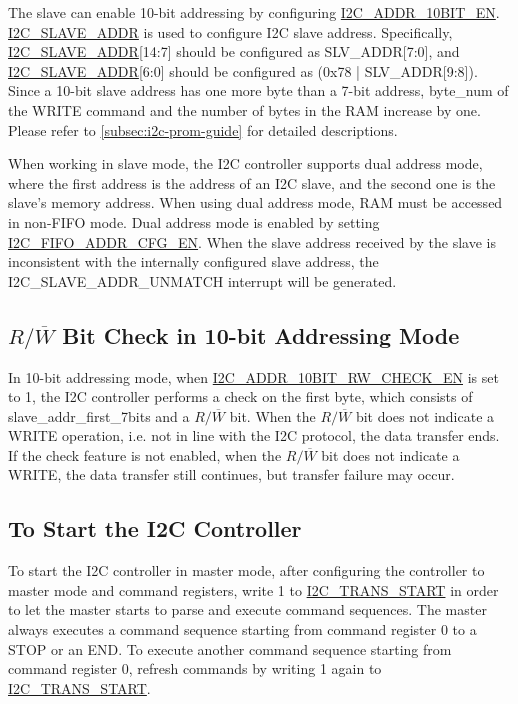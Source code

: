 \documentclass[main\_\_EN.tex]{subfiles}
\begin{document}
The slave can enable 10-bit addressing by configuring \hyperref[fielddesc:I2CADDR10BITEN]{I2C\_ADDR\_10BIT\_EN}. \hyperref[fielddesc:I2CSLAVEADDR]{I2C\_SLAVE\_ADDR} is used to configure I2C slave address. Specifically, \hyperref[fielddesc:I2CSLAVEADDR]{I2C\_SLAVE\_ADDR}[14:7] should be configured as SLV\_ADDR[7:0], and  \hyperref[fielddesc:I2CSLAVEADDR]{I2C\_SLAVE\_ADDR}[6:0] should be configured as (0x78 | SLV\_ADDR[9:8]). Since a 10-bit slave address has one more byte than a 7-bit address, byte\_num of the WRITE command and the number of bytes in the RAM increase by one. Please refer to \ref{subsec:i2c-prom-guide} for detailed descriptions.

When working in slave mode, the I2C controller supports dual address mode, where the first address is the address of an I2C slave, and the second one is the slave's memory address. When using dual address mode, RAM must be accessed in non-FIFO mode. 
Dual address mode is enabled by setting \hyperref[fielddesc:I2CFIFOADDRCFGEN]{I2C\_FIFO\_ADDR\_CFG\_EN}. When the slave address received by the slave is inconsistent with the internally configured slave address, the I2C\_SLAVE\_ADDR\_UNMATCH interrupt will be generated. 

\subsection{\texorpdfstring{$R/\overline W$ Bit Check in 10-bit Addressing Mode}{R/W Bit Check in 10-bit Addressing Mode}}
In 10-bit addressing mode, when \hyperref[fielddesc:I2CADDR10BITRWCHECKEN]{I2C\_ADDR\_10BIT\_RW\_CHECK\_EN} is set to 1, the I2C controller performs a check on the first byte, which consists of slave\_addr\_first\_7bits and a $R/\overline W$ bit. When the $R/\overline W$ bit does not indicate a WRITE operation, i.e. not in line with the I2C protocol, the data transfer ends. If the check feature is not enabled, when the $R/\overline W$ bit does not indicate a WRITE, the data transfer still continues, but transfer failure may occur.

\subsection{To Start the I2C Controller}\label{subsubsec:i2c-start}
To start the I2C controller in master mode, after configuring the controller to master mode and command registers, write 1 to \hyperref[fielddesc:I2CTRANSSTART]{I2C\_TRANS\_START} in order to let the master starts to parse and execute command sequences. The master always executes a command sequence starting from command register 0 to a STOP or an END. To execute another command sequence starting from command register 0, refresh commands by writing 1 again to \hyperref[fielddesc:I2CTRANSSTART]{I2C\_TRANS\_START}.
\end{document}
